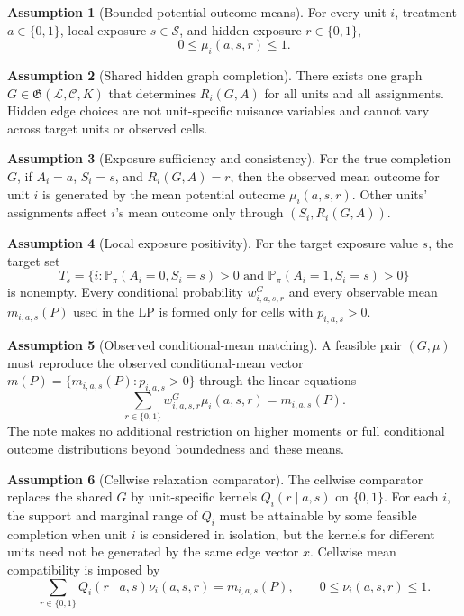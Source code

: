\documentclass[11pt]{article}
\renewcommand{\Pr}{\mathbb{P}}
\theoremstyle{definition}
\newtheorem{assumption}{Assumption}
\theoremstyle{plain}
\theoremstyle{remark}
\begin{document}
\begin{assumption}[Bounded potential-outcome means]\label{ass:bounded}
For every unit \(i\), treatment \(a\in\{0,1\}\), local exposure
\(s\in\mathcal S\), and hidden exposure \(r\in\{0,1\}\),
\[
0\le \mu_i(a,s,r)\le1.
\]
\end{assumption}

\begin{assumption}[Shared hidden graph completion]\label{ass:shared-completion}
There exists one graph \(G\in\mathfrak G(\mathcal L,\mathcal C,K)\) that
determines \(R_i(G,A)\) for all units and all assignments.  Hidden edge choices
are not unit-specific nuisance variables and cannot vary across target units or
observed cells.
\end{assumption}

\begin{assumption}[Exposure sufficiency and consistency]\label{ass:exposure-consistency}
For the true completion \(G\), if \(A_i=a\), \(S_i=s\), and \(R_i(G,A)=r\), then
the observed mean outcome for unit \(i\) is generated by the mean potential
outcome \(\mu_i(a,s,r)\).  Other units' assignments affect \(i\)'s mean outcome
only through \((S_i,R_i(G,A))\).
\end{assumption}

\begin{assumption}[Local exposure positivity]\label{ass:positivity}
For the target exposure value \(s\), the target set
\[
T_s=\{i:\Pr_\pi(A_i=0,S_i=s)>0\text{ and }\Pr_\pi(A_i=1,S_i=s)>0\}
\]
is nonempty.  Every conditional probability \(w^G_{i,a,s,r}\) and every
observable mean \(m_{i,a,s}(P)\) used in the LP is formed only for cells with
\(p_{i,a,s}>0\).
\end{assumption}

\begin{assumption}[Observed conditional-mean matching]\label{ass:law-matching}
A feasible pair \((G,\mu)\) must reproduce the observed conditional-mean vector
\(m(P)=\{m_{i,a,s}(P):p_{i,a,s}>0\}\) through the linear equations
\[
\sum_{r\in\{0,1\}}w^G_{i,a,s,r}\mu_i(a,s,r)=m_{i,a,s}(P).
\]
The note makes no additional restriction on higher moments or full conditional
outcome distributions beyond boundedness and these means.
\end{assumption}

\begin{assumption}[Cellwise relaxation comparator]\label{ass:cellwise-comparator}
The cellwise comparator replaces the shared \(G\) by unit-specific kernels
\(Q_i(r\mid a,s)\) on \(\{0,1\}\).  For each \(i\), the support and marginal
range of \(Q_i\) must be attainable by some feasible completion when unit \(i\)
is considered in isolation, but the kernels for different units need not be
generated by the same edge vector \(x\).  Cellwise mean compatibility is imposed
by
\[
\sum_{r\in\{0,1\}}Q_i(r\mid a,s)\nu_i(a,s,r)=m_{i,a,s}(P),
\qquad 0\le\nu_i(a,s,r)\le1.
\]
\end{assumption}
\end{document}
